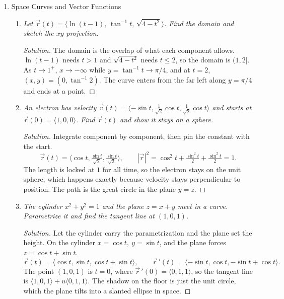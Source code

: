 \documentclass[12pt]{article}
\newenvironment{solution}
  {\renewcommand\qedsymbol{$\blacksquare$}\begin{proof}[Solution]}
  {\end{proof}}
\begin{document}
\begin{enumerate}
\begin{enumerate}
    \end{enumerate}
\newpage

\item Space Curves and Vector Functions

    \begin{enumerate}
    \item \textit{Let $\vec r(t)=\langle\ln(t-1),\,\tan^{-1} t,\,\sqrt{4-t^2}\rangle$. Find the domain and sketch the $xy$ projection.}

    \begin{solution}
    The domain is the overlap of what each component allows. $\ln(t-1)$ needs $t>1$ and $\sqrt{4-t^2}$ needs $t\le2$, so the domain is $(1,2]$. As $t\to1^+$, $x\to-\infty$ while $y=\tan^{-1} t\to\pi/4$, and at $t=2$, $(x,y)=(0,\tan^{-1} 2)$. The curve enters from the far left along $y=\pi/4$ and ends at a point.
    \end{solution}

    \item \textit{An electron has velocity $\vec v(t)=\langle -\sin t,\tfrac{1}{\sqrt2}\cos t,\tfrac{1}{\sqrt2}\cos t\rangle$ and starts at $\vec r(0)=\langle1,0,0\rangle$. Find $\vec r(t)$ and show it stays on a sphere.}

    \begin{solution}
    Integrate component by component, then pin the constant with the start.
    \[
      \vec r(t)=\langle\cos t,\tfrac{\sin t}{\sqrt2},\tfrac{\sin t}{\sqrt2}\rangle,\qquad
      |\vec r|^2=\cos^2t+\tfrac{\sin^2t}{2}+\tfrac{\sin^2t}{2}=1.
    \]
    The length is locked at $1$ for all time, so the electron stays on the unit sphere, which happens exactly because velocity stays perpendicular to position. The path is the great circle in the plane $y=z$.
    \end{solution}

    \item \textit{The cylinder $x^2+y^2=1$ and the plane $z=x+y$ meet in a curve. Parametrize it and find the tangent line at $(1,0,1)$.}

    \begin{solution}
    Let the cylinder carry the parametrization and the plane set the height. On the cylinder $x=\cos t,\ y=\sin t$, and the plane forces $z=\cos t+\sin t$.
    \[
      \vec r(t)=\langle\cos t,\sin t,\cos t+\sin t\rangle,\qquad \vec r\,'(t)=\langle-\sin t,\cos t,-\sin t+\cos t\rangle.
    \]
    The point $(1,0,1)$ is $t=0$, where $\vec r\,'(0)=\langle0,1,1\rangle$, so the tangent line is $\langle1,0,1\rangle+u\langle0,1,1\rangle$. The shadow on the floor is just the unit circle, which the plane tilts into a slanted ellipse in space.
    \end{solution}


\end{enumerate}
\end{enumerate}
\end{document}
